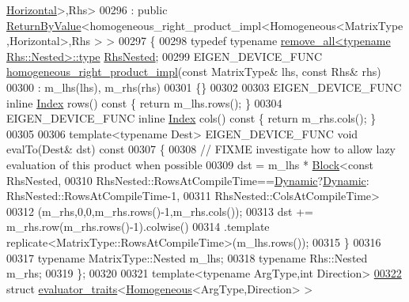 \begin{DoxyCode}
      \hyperlink{group__enums_ggad49a7b3738e273eb00932271b36127f7aae8a16b3b9272683c1162915f6d892be}{Horizontal}>,Rhs>
00296   : \textcolor{keyword}{public} \hyperlink{group___core___module_class_eigen_1_1_return_by_value}{ReturnByValue}<homogeneous\_right\_product\_impl<Homogeneous<MatrixType,Horizontal>,Rhs
      > >
00297 \{
00298   \textcolor{keyword}{typedef} \textcolor{keyword}{typename} \hyperlink{group___sparse_core___module}{remove\_all<typename Rhs::Nested>::type} 
      \hyperlink{group___sparse_core___module}{RhsNested};
00299   EIGEN\_DEVICE\_FUNC \hyperlink{struct_eigen_1_1internal_1_1homogeneous__right__product__impl}{homogeneous\_right\_product\_impl}(\textcolor{keyword}{const} MatrixType& lhs, \textcolor{keyword}{
      const} Rhs& rhs)
00300     : m\_lhs(lhs), m\_rhs(rhs)
00301   \{\}
00302 
00303   EIGEN\_DEVICE\_FUNC \textcolor{keyword}{inline} \hyperlink{namespace_eigen_a62e77e0933482dafde8fe197d9a2cfde}{Index} rows()\textcolor{keyword}{ const }\{ \textcolor{keywordflow}{return} m\_lhs.rows(); \}
00304   EIGEN\_DEVICE\_FUNC \textcolor{keyword}{inline} \hyperlink{namespace_eigen_a62e77e0933482dafde8fe197d9a2cfde}{Index} cols()\textcolor{keyword}{ const }\{ \textcolor{keywordflow}{return} m\_rhs.cols(); \}
00305 
00306   \textcolor{keyword}{template}<\textcolor{keyword}{typename} Dest> EIGEN\_DEVICE\_FUNC \textcolor{keywordtype}{void} evalTo(Dest& dst)\textcolor{keyword}{ const}
00307 \textcolor{keyword}{  }\{
00308     \textcolor{comment}{// FIXME investigate how to allow lazy evaluation of this product when possible}
00309     dst = m\_lhs * \hyperlink{group___core___module_class_eigen_1_1_block}{Block}<\textcolor{keyword}{const} RhsNested,
00310                         RhsNested::RowsAtCompileTime==\hyperlink{namespace_eigen_ad81fa7195215a0ce30017dfac309f0b2}{Dynamic}?\hyperlink{namespace_eigen_ad81fa7195215a0ce30017dfac309f0b2}{Dynamic}:
      RhsNested::RowsAtCompileTime-1,
00311                         RhsNested::ColsAtCompileTime>
00312             (m\_rhs,0,0,m\_rhs.rows()-1,m\_rhs.cols());
00313     dst += m\_rhs.row(m\_rhs.rows()-1).colwise()
00314             .template replicate<MatrixType::RowsAtCompileTime>(m\_lhs.rows());
00315   \}
00316 
00317   \textcolor{keyword}{typename} MatrixType::Nested m\_lhs;
00318   \textcolor{keyword}{typename} Rhs::Nested m\_rhs;
00319 \};
00320 
00321 \textcolor{keyword}{template}<\textcolor{keyword}{typename} ArgType,\textcolor{keywordtype}{int} Direction>
\hyperlink{struct_eigen_1_1internal_1_1evaluator__traits_3_01_homogeneous_3_01_arg_type_00_01_direction_01_4_01_4}{00322} \textcolor{keyword}{struct }\hyperlink{struct_eigen_1_1internal_1_1evaluator__traits}{evaluator\_traits}<\hyperlink{group___geometry___module_class_eigen_1_1_homogeneous}{Homogeneous}<ArgType,Direction> >

\end{DoxyCode}
